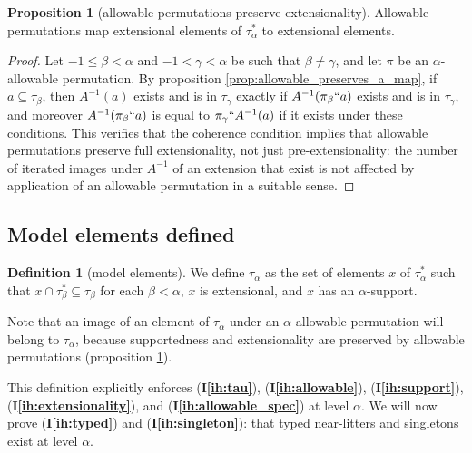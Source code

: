 \documentclass{article}
\theoremstyle{definition}
\newtheorem{proposition}[theorem]{Proposition}
\newtheorem{definition}[theorem]{Definition}
\theoremstyle{remark}
\newcommand{\ihref}[1]{(\textbf{I\ref{#1}})}
\begin{document}
{\begin{proposition}[allowable permutations preserve extensionality]\label{prop:allowable_preserves_extensionality}
Allowable permutations map extensional elements of $\tau_\alpha^*$ to extensional elements.
\end{proposition}
\begin{proof}
Let $-1 \leq \beta < \alpha$ and $-1 < \gamma < \alpha$ be such that $\beta \neq \gamma$, and let $\pi$ be an $\alpha$-allowable permutation.
By proposition \ref{prop:allowable_preserves_a_map}, if $a \subseteq \tau_\beta$, then $A^{-1}(a)$ exists and is in $\tau_\gamma$ exactly if $A^{-1}(\pi_\beta``a)$ exists and is in $\tau_\gamma$, and moreover $A^{-1}(\pi_\beta``a)$ is equal to $\pi_\gamma``A^{-1}(a)$ if it exists under these conditions.  This verifies that the coherence condition implies that allowable permutations preserve full extensionality, not just pre-extensionality:  the number of iterated images under $A^{-1}$ of an extension that exist is not affected by application of an allowable permutation in a suitable sense.
\end{proof}

\subsection{Model elements defined}\label{ss:model_elements}


\begin{definition}[model elements]
We define $\tau_\alpha$ as the set of elements $x$ of $\tau^*_\alpha$ such that
$x \cap \tau^*_{\beta} \subseteq \tau_\beta$ for each $\beta<\alpha$, $x$ is extensional, and $x$ has an $\alpha$-support.

\end{definition}

Note that an image of an element of $\tau_\alpha$ under an $\alpha$-allowable permutation will belong to $\tau_\alpha$, because supportedness and extensionality are preserved by allowable permutations (proposition \ref{prop:allowable_preserves_extensionality}).

This definition explicitly enforces \ihref{ih:tau}, \ihref{ih:allowable}, \ihref{ih:support}, \ihref{ih:extensionality}, and \ihref{ih:allowable_spec} at level $\alpha$.
We will now prove \ihref{ih:typed} and \ihref{ih:singleton}: that typed near-litters and singletons exist at level $\alpha$.

}
\end{document}

